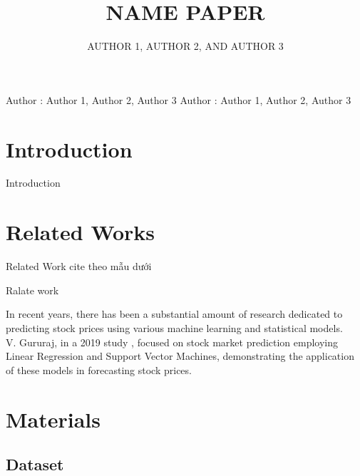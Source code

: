 \documentclass{ieeeojies}
\begin{document}
\title{NAME PAPER}

\author{\uppercase{Author 1},
\uppercase{Author 2, and Author 3}}

\address[1]{Faculty of Information Systems, University of Information Technology, (e-mail: Email 1)}
\address[2]{Faculty of Information Systems, University of Information Technology, (e-mail: Email 2)}
\address[3]{Faculty of Information Systems, University of Information Technology, (e-mail: Email 3)}

\markboth
{Author \headeretal: Author 1, Author 2, Author 3}
{Author \headeretal: Author 1, Author 2, Author 3}

\begin{abstract}
\end{abstract}

\begin{keywords}
\end{keywords}

\titlepgskip=-15pt

\maketitle

\section{Introduction}
\label{sec:introduction}
Introduction 

\section{Related Works}
Related Work cite theo mẫu dưới

Ralate work

In recent years, there has been a substantial amount of research dedicated to predicting stock prices using various machine learning and statistical models. \\
V. Gururaj, in a 2019 study \cite{b1}, focused on stock market prediction employing Linear Regression and Support Vector Machines, demonstrating the application of these models in forecasting stock prices.\\
\section{Materials}
\subsection{Dataset}
\end{document}
